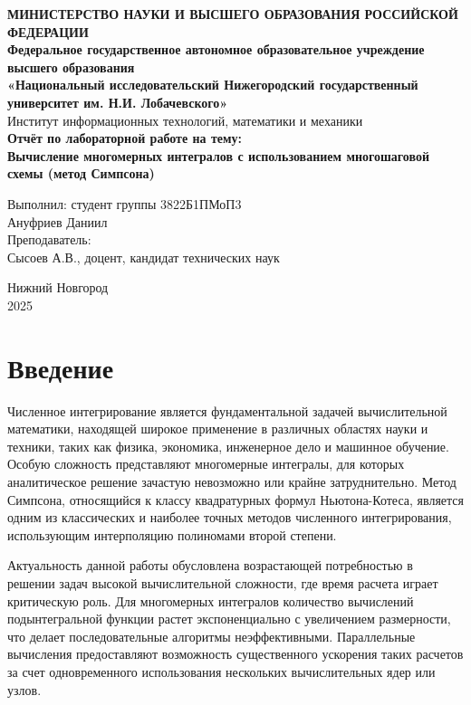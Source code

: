 \documentclass[a4paper,12pt]{article}
\begin{document}
\begin{titlepage}
\begin{center}
\textbf{МИНИСТЕРСТВО НАУКИ И ВЫСШЕГО ОБРАЗОВАНИЯ РОССИЙСКОЙ ФЕДЕРАЦИИ} \\[0.5cm]
\textbf{Федеральное государственное автономное образовательное учреждение высшего образования} \\[0.5cm]
\textbf{«Национальный исследовательский Нижегородский государственный университет им. Н.И. Лобачевского»} \\[0.5cm]
Институт информационных технологий, математики и механики \\
\vfill
{\Large
\textbf{Отчёт по лабораторной работе на тему:} \\[0.5cm]
\textbf{Вычисление многомерных интегралов с использованием многошаговой схемы (метод Симпсона)} \\
}
\vfill
\begin{flushright}
Выполнил: студент группы 3822Б1ПМоП3 \\
Ануфриев Даниил \\
\vspace{1cm}
Преподаватель: \\
Сысоев А.В., доцент, кандидат технических наук \\
\end{flushright}
\vfill
Нижний Новгород \\
2025
\end{center}
\end{titlepage}

\tableofcontents
\newpage

\section*{Введение}

Численное интегрирование является фундаментальной задачей вычислительной математики, находящей широкое применение в различных областях науки и техники, таких как физика, экономика, инженерное дело и машинное обучение. Особую сложность представляют многомерные интегралы, для которых аналитическое решение зачастую невозможно или крайне затруднительно. Метод Симпсона, относящийся к классу квадратурных формул Ньютона-Котеса, является одним из классических и наиболее точных методов численного интегрирования, использующим интерполяцию полиномами второй степени.

Актуальность данной работы обусловлена возрастающей потребностью в решении задач высокой вычислительной сложности, где время расчета играет критическую роль. Для многомерных интегралов количество вычислений подынтегральной функции растет экспоненциально с увеличением размерности, что делает последовательные алгоритмы неэффективными. Параллельные вычисления предоставляют возможность существенного ускорения таких расчетов за счет одновременного использования нескольких вычислительных ядер или узлов.
\end{document}
